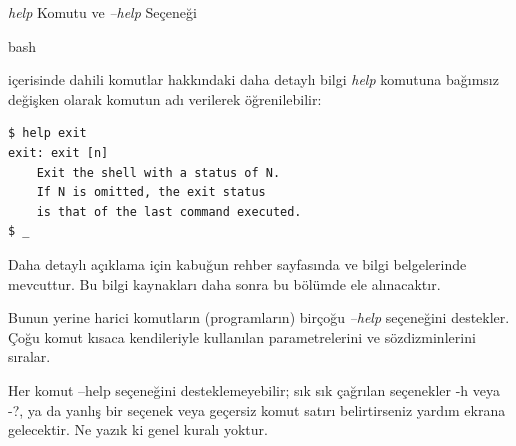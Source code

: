 \begin{section}{\emph{help} Komutu ve \emph{--help} Seçeneği}

\begin{em}bash\end{em} içerisinde dahili komutlar hakkındaki daha detaylı bilgi \emph{help} komutuna bağımsız değişken olarak komutun adı verilerek öğrenilebilir:
\begin{verbatim}
$ help exit
exit: exit [n]
    Exit the shell with a status of N.
    If N is omitted, the exit status
    is that of the last command executed.
$ _
\end{verbatim}

Daha detaylı açıklama için kabuğun rehber sayfasında ve bilgi belgelerinde mevcuttur. Bu bilgi kaynakları daha sonra bu bölümde ele alınacaktır.

Bunun yerine harici komutların (programların) birçoğu \emph{--help} seçeneğini destekler. Çoğu komut kısaca kendileriyle kullanılan parametrelerini ve sözdizminlerini sıralar.

Her komut --help seçeneğini desteklemeyebilir; sık sık çağrılan seçenekler -h veya -?, ya da yanlış bir seçenek veya geçersiz komut satırı belirtirseniz yardım ekrana gelecektir. Ne yazık ki genel kuralı yoktur.
\end{section}
